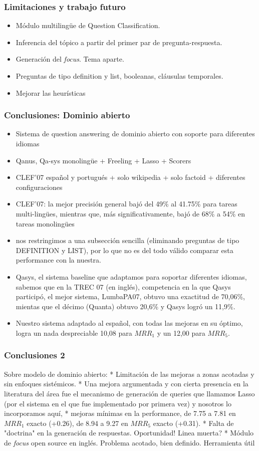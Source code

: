 \begin{frame}
\frametitle{Limitaciones y trabajo futuro}
\begin{itemize}
  \item Módulo multilingüe de Question Classification.
  \item Inferencia del tópico a partir del primer par de pregunta-respuesta.
  \item Generación del \textit{focus}. Tema aparte.
  \item Preguntas de tipo definition y list, booleanas, cláusulas temporales.
  \item Mejorar las heurísticas
\end{itemize}

\end{frame}


\begin{frame}
\frametitle{Conclusiones: Dominio abierto}
  \begin{itemize}
    \item Sistema de question answering de dominio abierto con soporte para diferentes idiomas
    \item Qanus, Qa-sys monolingüe + Freeling + Lasso + Scorers
    \item CLEF'07 español y portugués + solo wikipedia + solo factoid + diferentes configuraciones
    \item CLEF'07: la mejor precisión general bajó del 49\% al 41.75\% para tareas multi-lingües, mientras que, más significativamente, bajó de 68\% a 54\% en tareas monolingües
    \item nos restringimos a una subsección sencilla (eliminando preguntas de tipo DEFINITION y LIST), por lo que no es del todo válido comparar esta performance con la nuestra.
    \item Qasys, el sistema baseline que adaptamos para soportar diferentes idiomas, sabemos que en la TREC 07 (en inglés), competencia en la que Qasys participó, el mejor sistema, LumbaPA07, obtuvo una exactitud de 70,06\%, mientas que el décimo (Quanta) obtuvo 20,6\% y Qasys logró un 11,9\%.
\item Nuestro sistema adaptado al español, con todas las mejoras en su óptimo, logra un nada despreciable 10,08 para $MRR_1$ y un 12,00 para $MRR_5$.
  \end{itemize}

\end{frame}

\begin{frame}
\frametitle{Conclusiones 2}

Sobre modelo de dominio abierto:
 * Limitación de las mejoras a zonas acotadas y sin enfoques sistémicos. 
 * Una mejora argumentada y con cierta presencia en la literatura del área fue el mecanismo de generación de queries que llamamos Lasso (por el sistema en el que fue implementado por primera vez) y nosotros lo incorporamos aquí, 
    *  mejoras mínimas en la performance, de 7.75 a 7.81 en $MRR_1$ exacto (+0.26), de 8.94 a 9.27 en $MRR_5$ exacto (+0.31). 
  * Falta de "doctrina" en la generación de respuestas. Oportunidad! Linea muerta? 
* Módulo de \textit{focus} open source en inglés. Problema acotado, bien definido. Herramienta útil

\end{frame}